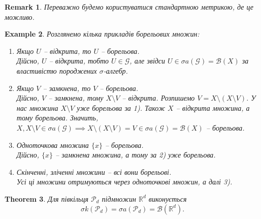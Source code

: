\documentclass[a4paper, 10pt]{article}
\theoremstyle{theoremdd}
\newtheorem{theorem}{Theorem}[subsection]
\newtheorem{example}[theorem]{Example}
\newtheorem{remark}[theorem]{Remark}
\begin{document}
\begin{remark}
Переважно будемо користуватися стандартною метрикою, де це можливо.
\end{remark}

\begin{example}
Розглянемо кілька прикладів борельових множин:
\begin{enumerate}[wide=0pt,label={\arabic*)}]
\item Якщо $U$ -- відкрита, то $U$ -- борельова.\\
Дійсно, $U$ -- відкрита, тобто $U \in \mathcal{G}$, але звідси $U \in \sigma a(\mathcal{G}) = \mathcal{B}(X)$ за властивістю породжених $\sigma$-алгебр.

\item Якщо $V$ -- замкнена, то $V$ -- борельова.\\
Дійсно, $V$ -- замкнена, тому $X \setminus V$ -- відкрита. Розпишемо $V = X \setminus (X \setminus V)$. У нас множина $X \setminus V$ уже борельова за 1). Також $X$ -- відкрита множина, а тому борельова. Значить, $X, X \setminus V \in \sigma a(\mathcal{G}) \implies X \setminus (X \setminus V) = V \in \sigma a(\mathcal{G}) = \mathcal{B}(X)$ -- борельова.

\item Одноточкова множина $\{x\}$ -- борельова.\\
Дійсно, $\{x\}$ -- замкнена множина, а тому за 2) уже борельова.

\item Скінченні, зліченні множини -- всі вони борельові.\\
Усі ці множини отримуються через одноточкові множин, а далі 3).
\end{enumerate}
\end{example}

\begin{theorem}
Для півкільця $\mathcal{P}_d$ підмножин $\mathbb{R}^d$ виконується
\begin{equation}
\label{eq:sigma_ring_and_sigma_algebra_of_P_d_is_a_borel_sigma_algebra_of_R^d}
\sigma k(\mathcal{P}_d) = \sigma a(\mathcal{P}_d) = \mathcal{B}(\mathbb{R}^d).
\end{equation}
\end{theorem}
\end{document}
